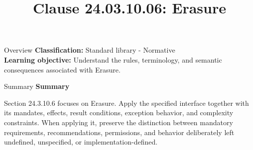\documentclass[10pt,letterpaper]{article}
\title{Clause 24.03.10.06: Erasure}
\author{}
\date{}
\begin{document}
\maketitle
\begin{CornellOverviewBox}{Overview}
\textbf{Classification:} Standard library - Normative\\[2pt]
\textbf{Learning objective:} Understand the rules, terminology, and semantic consequences associated with Erasure.
\end{CornellOverviewBox}\begin{CornellSummaryBox}{Summary}
{\sffamily\bfseries\color{Accent} Summary}\par\vspace{3pt}Section 24.3.10.6 focuses on Erasure. Apply the specified interface together with its mandates, effects, result conditions, exception behavior, and complexity constraints. When applying it, preserve the distinction between mandatory requirements, recommendations, permissions, and behavior deliberately left undefined, unspecified, or implementation-defined.
\end{CornellSummaryBox}
\end{document}
